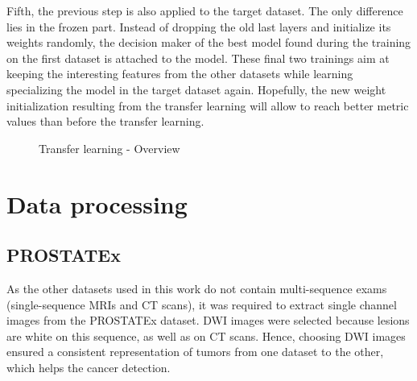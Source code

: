Fifth, the previous step is also applied to the target dataset. The only difference lies in the frozen part. Instead of dropping the old last layers and initialize its weights randomly, the decision maker of the best model found during the training on the first dataset is attached to the model. These final two trainings aim at keeping the interesting features from the other datasets while learning specializing the model in the target dataset again. Hopefully, the new weight initialization resulting from the transfer learning will allow to reach better metric values than before the transfer learning. 


\begin{figure}[!h]
\centering
\noindent
{}
\caption{Transfer learning - Overview}
\label{fig:tl_overview}
\end{figure}


\section{Data processing}
\subsection{PROSTATEx}
\label{sec:PROSTATEx}
As the other datasets used in this work do not contain multi-sequence exams (single-sequence MRIs and CT scans), it was required to extract single channel images from the PROSTATEx dataset. DWI images were selected because lesions are white on this sequence, as well as on CT scans. Hence, choosing DWI images ensured a consistent representation of tumors from one dataset to the other, which helps the cancer detection.

